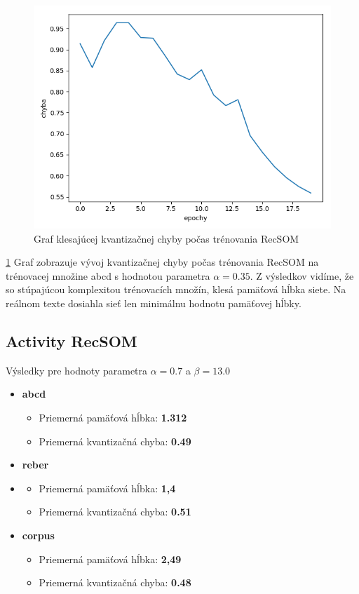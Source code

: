 \begin{figure}[H]
    \centering
    \includegraphics[width=\textwidth]{assets/r_error_top}
    \caption{Graf klesajúcej kvantizačnej chyby počas trénovania RecSOM}
    \label{kvantizacna_chyba_recsom}

\end{figure}

\ref{kvantizacna_chyba_recsom} Graf zobrazuje vývoj kvantizačnej chyby počas trénovania RecSOM
na trénovacej množine abcd s hodnotou parametra $\alpha = 0.35$.
Z výsledkov vidíme, že so stúpajúcou komplexitou trénovacích množín, klesá pamäťová hĺbka siete.
Na reálnom texte dosiahla sieť len minimálnu hodnotu pamäťovej hĺbky.

\subsection{Activity RecSOM}
Výsledky pre hodnoty parametra $\alpha = 0.7$ a $\beta = 13.0$
\begin{itemize}
    \item \textbf{abcd}
    \begin{itemize}
        \item Priemerná pamäťová hĺbka: \textbf{1.312}
        \item Priemerná kvantizačná chyba: \textbf{0.49}
    \end{itemize}
    \item \textbf{reber}
    \item \begin{itemize}
        \item Priemerná pamäťová hĺbka: \textbf{1,4}
        \item Priemerná kvantizačná chyba: \textbf{0.51}
    \end{itemize}
    \item \textbf{corpus}
    \begin{itemize}
        \item Priemerná pamäťová hĺbka: \textbf{2,49}
        \item Priemerná kvantizačná chyba: \textbf{0.48}
    \end{itemize}
\end{itemize}

